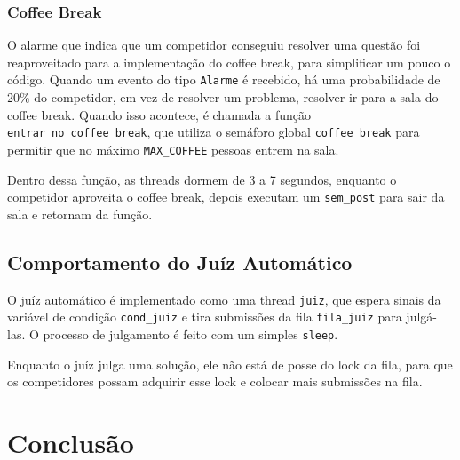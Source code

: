 \documentclass[11pt]{article}
\newcommand{\code}{\lstinline[mathescape=true]}
\begin{document}
	\subsubsection{Coffee Break}
	O alarme que indica que um competidor conseguiu resolver uma questão foi reaproveitado para a
	implementação do coffee break, para simplificar um pouco o código. Quando um evento do tipo
	\code{Alarme} é recebido, há uma probabilidade de 20\% do competidor, em vez de resolver um problema,
	resolver ir para a sala do coffee break. Quando isso acontece, é chamada a função
	\code{entrar_no_coffee_break}, que utiliza o semáforo global \code{coffee_break} para permitir que no
	máximo \code{MAX_COFFEE} pessoas entrem na sala.

	Dentro dessa função, as threads dormem de 3 a 7 segundos, enquanto o competidor aproveita o coffee
	break, depois executam um \code{sem_post} para sair da sala e retornam da função.


	\subsection{Comportamento do Juíz Automático}
	O juíz automático é implementado como uma thread \code{juiz}, que espera sinais da variável de
	condição \code{cond_juiz} e tira submissões da fila \code{fila_juiz} para julgá-las. O processo de
	julgamento é feito com um simples \code{sleep}.

	Enquanto o juíz julga uma solução, ele não está de posse do lock da fila, para que os competidores
	possam adquirir esse lock e colocar mais submissões na fila.


	\section{Conclusão}


	\medskip
	\printbibliography

	
\end{document}
